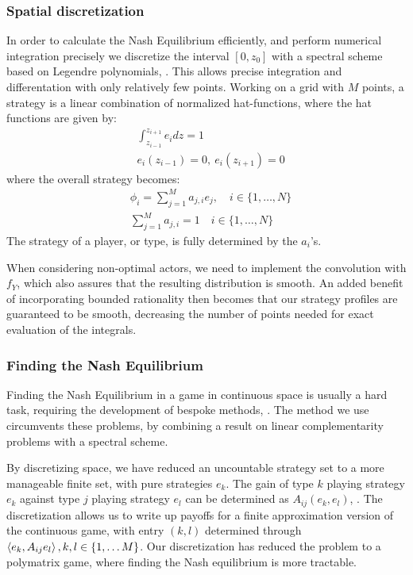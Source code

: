\subsubsection{Spatial discretization}
In order to calculate the Nash Equilibrium efficiently, and perform numerical integration precisely we discretize the interval $[0,z_0]$ with a spectral scheme based on Legendre polynomials, \citep{kopriva2009implementing}. This allows precise integration and differentation with only relatively few points. Working on a grid with $M$ points, a strategy is a linear combination of normalized hat-functions, where the hat functions are given by:
\begin{align*}
	& \int_{z_{i-1}}^{z_{i+1}} e_i dz = 1 \\
	&e_i(z_{i-1}) = 0,~ e_i(z_{i+1}) = 0
\end{align*}
where the overall strategy becomes:
\begin{align*}
  &\phi_{i} = \sum_{j=1}^M a_{j,i} e_j, \quad i\in \{1,\dots, N\} \\
  &\sum_{j=1}^M a_{j,i} = 1 \quad i\in \{1,\dots, N\}
\end{align*}
The strategy of a player, or type, is fully determined by the $a_i$'s.


When considering non-optimal actors, we need to implement the convolution with $f_Y$, which also assures that the resulting distribution is smooth. An added benefit of incorporating bounded rationality then becomes that our strategy profiles are guaranteed to be smooth, decreasing the number of points needed for exact evaluation of the integrals.


\subsubsection{Finding the Nash Equilibrium}
Finding the Nash Equilibrium in a game in continuous space is usually a hard task, requiring the development of bespoke methods, \citep{verticalmigration, jerome}. The method we use circumvents these problems, by combining a result on linear complementarity problems \citep{miller1991copositive} with a spectral scheme.

By discretizing space, we have reduced an uncountable strategy set to a more manageable finite set, with pure strategies $e_k$. The gain of type $k$ playing strategy $e_k$ against type $j$ playing strategy $e_l$ can be determined as $A_{ij}(e_k,e_l)$, . The discretization allows us to write up payoffs for a finite approximation version of the continuous game,  with entry $(k,l)$ determined through $\left \langle e_k,A_{ij}e_l \right \rangle, k,l \in \{1,\dots M\}$.
Our discretization has reduced the problem to a polymatrix game, where finding the Nash equilibrium is more tractable.

